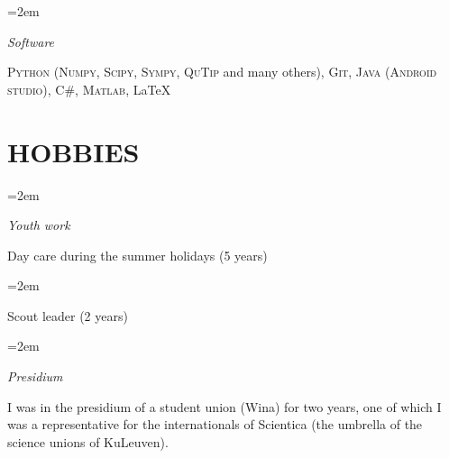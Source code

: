 \documentclass[paper=a4,fontsize=11pt]{scrartcl} %
\newlength{\spacebox}
\newcommand{\NewPart}[1]{\section*{\uppercase{#1}}}
\newcommand{\PersonalEntry}[2]{
		\noindent\hangindent=2em\hangafter=0 %
		\parbox{\spacebox}{        %
		\textit{#1}}		       %
		\hspace{1.5em} #2 \par}    %
\newcommand{\SkillsEntry}[2]{      %
		\noindent\hangindent=2em\hangafter=0 %
		\parbox[t]{\spacebox}{        %
		\textit{#1}}			   %
		\hspace{1.5em} \parbox[t]{0.8\textwidth}{#2} \par}    %
\begin{document}
\SkillsEntry{Software}{\textsc{Python} (\textsc{Numpy}, \textsc{Scipy}, \textsc{Sympy}, \textsc{QuTip} and many others), \textsc{Git}, \textsc{Java} (\textsc{Android studio}), C\#, \textsc{Matlab}, \LaTeX}

\NewPart{Hobbies}{}

\SkillsEntry{Youth work}{Day care during the summer holidays (5 years)}
\SkillsEntry{}{Scout leader (2 years)}
\SkillsEntry{Presidium}{I was in the presidium of a student union (Wina) for two years, one of which I was a representative for the internationals of Scientica (the umbrella of the science unions of KuLeuven).}

\clearpage


\end{document}
